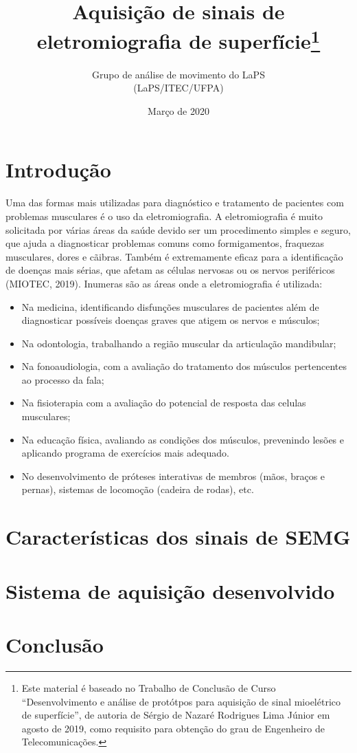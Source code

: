 \documentclass[a4paper,11pt]{article}
\title{Aquisição de sinais de eletromiografia de superfície\footnote{Este material é baseado no Trabalho de Conclusão de Curso ``Desenvolvimento e análise de protótpos para aquisição de sinal mioelétrico de superfície'', de autoria de Sérgio de Nazaré Rodrigues Lima Júnior em agosto de 2019, como requisito para obtenção do grau de Engenheiro de Telecomunicações.}}
\author{Grupo de análise de movimento do LaPS\\
        (LaPS/ITEC/UFPA)}
\date{Março de 2020}
\begin{document}
  \maketitle
  \section{Introdução}
  \label{sec:intro}
  Uma das formas mais utilizadas para diagnóstico e tratamento de pacientes com
problemas musculares é o uso da eletromiografia. A eletromiografia é muito solicitada por várias áreas da saúde devido ser um procedimento simples e seguro, que ajuda a diagnosticar problemas comuns como formigamentos, fraquezas musculares, dores e cãibras. Também é extremamente eficaz para a identificação de doenças mais sérias, que afetam as células nervosas ou os nervos periféricos (MIOTEC, 2019). Inumeras são as áreas onde a eletromiografia é utilizada:
   \begin{itemize}
     \item Na medicina, identificando disfunções musculares de pacientes além de diagnosticar possíveis doenças graves que atigem os nervos e músculos;
     \item Na odontologia, trabalhando a região muscular da articulação mandibular;
     \item Na fonoaudiologia, com a avaliação do tratamento dos músculos pertencentes ao processo da fala;
     \item Na fisioterapia com a avaliação do potencial de resposta das celulas musculares;
     \item Na educação física, avaliando as condições dos músculos, prevenindo lesões e aplicando programa de exercícios mais adequado.
     \item No desenvolvimento de próteses interativas de membros (mãos, braços e pernas), sistemas de locomoção (cadeira de rodas), etc.
   \end{itemize}

  \section{Características dos sinais de SEMG}
  \label{sec:carac}
 
  \section{Sistema de aquisição desenvolvido}
  \label{sec:sist}
  
  \section{Conclusão}
  \label{sec:concl}
 
  \printbibliography
\end{document}

